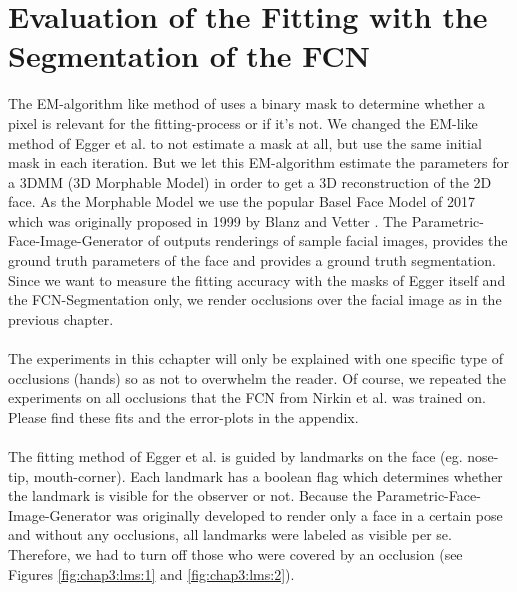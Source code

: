 \chapter{Evaluation of the Fitting with the Segmentation of the FCN}
The EM-algorithm like method of \cite{egger_paper} uses a binary mask to determine whether a pixel is relevant for the fitting-process or if it's not. We changed the EM-like method of Egger et al. to not estimate a mask at all, but use the same initial mask in each iteration. But we let this EM-algorithm estimate the parameters for a 3DMM (3D Morphable Model) in order to get a 3D reconstruction of the 2D face. As the Morphable Model we use the popular Basel Face Model of 2017 \cite{BFM2017} which was originally proposed in 1999 by Blanz and Vetter \cite{BlanzVetter}. The Parametric-Face-Image-Generator of \cite{parametric} outputs renderings of sample facial images, provides the ground truth parameters of the face and provides a ground truth segmentation. Since we want to measure the fitting accuracy with the masks of Egger itself and the FCN-Segmentation only, we render occlusions over the facial image as in the previous chapter.\\
\\
The experiments in this cchapter will only be explained with one specific type of occlusions (hands) so as not to overwhelm the reader. Of course, we repeated the experiments on all occlusions that the FCN from Nirkin et al. was trained on. Please find these fits and the error-plots in the appendix. \\
\\
The fitting method of Egger et al. is guided by landmarks on the face (eg. nose-tip, mouth-corner). Each landmark has a boolean flag which determines whether the landmark is visible for the observer or not. Because the Parametric-Face-Image-Generator was originally developed to render only a face in a certain pose and without any occlusions, all landmarks were labeled as visible per se. Therefore, we had to turn off those who were covered by an occlusion (see Figures \ref{fig:chap3:lms:1} and \ref{fig:chap3:lms:2}).\\
\\
